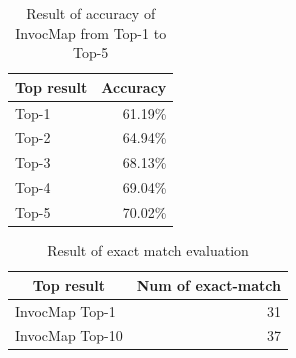 \documentclass[sigconf,review,anonymous]{article}
\begin{document}
\begin{table}[]
\caption{Result of accuracy of InvocMap from Top-1 to Top-5}
\label{tbl:Q4ResultTopK}
\centering
\begin{tabular}{|l|r|}
\hline
\multicolumn{1}{|c|}{\textbf{Top result}} & \multicolumn{1}{c|}{\textbf{Accuracy}} \\ \hline
Top-1                                     & 61.19\%                                \\ \hline
Top-2                                     & 64.94\%                                \\ \hline
Top-3                                     & 68.13\%                                \\ \hline
Top-4                                     & 69.04\%                                \\ \hline
Top-5                                     & 70.02\%                                \\ \hline
\end{tabular}
\end{table}

\begin{table}[]
\caption{Result of exact match evaluation}
\label{tbl:Q4ResultExactMatch}
\centering
\begin{tabular}{|l|r|}
\hline
\multicolumn{1}{|c|}{\textbf{Top result}} & \multicolumn{1}{c|}{\textbf{Num of exact-match}} \\ \hline
InvocMap Top-1                            & 31                                               \\ \hline
InvocMap Top-10                           & 37                                               \\ \hline
\end{tabular}
\end{table}
\end{document}
